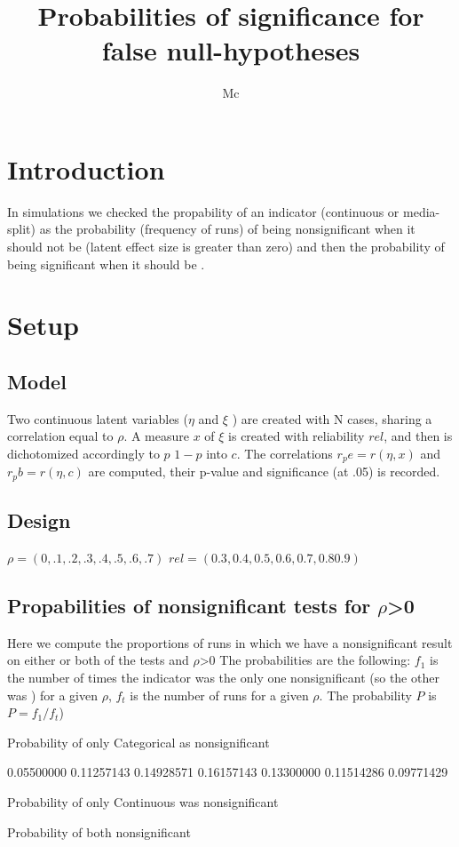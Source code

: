 \documentclass{article}
\begin{document}


\title{Probabilities of significance for false null-hypotheses}

\author{Mc}
\maketitle
\section*{Introduction}
In simulations we checked the propability of an indicator (continuous or media-split) as the probability (frequency of runs) of being nonsignificant when it should not be (latent effect size is greater than zero) and then the probability of being significant when it should be .
\section*{Setup}
\subsection*{Model}
Two continuous latent variables (\(\eta\) and \(\xi\) ) are created with N cases, sharing a correlation equal to \(\rho\). A measure \(x\) of \(\xi\) is created with reliability \(rel\), and then  is dichotomized accordingly to \(p\) \(1-p\) into \(c\). The correlations \( r_pe=r(\eta,x) \)  and \( r_pb=r(\eta,c) \) are computed, their p-value and significance (at .05) is recorded.
\subsection*{Design}
\(\rho=(0,.1,.2,.3,.4,.5,.6,.7) \)
\(rel=(0.3, 0.4 ,0.5, 0.6, 0.7 ,0.8 0.9) \) 


\subsection*{Propabilities of nonsignificant tests for  \(\rho\)>0}

Here we compute the proportions of runs in which we have a nonsignificant result on either or both of the tests and \(\rho\)>0
The probabilities are the following: \(f_1\) is the number of times the indicator was the only one nonsignificant (so the other was ) for a given \(\rho\), \(f_t\) is the number of runs for a given \(\rho\). The probability \(P\) is \(P=f_1 / f_t \))  


\begin{Schunk}
\begin{Soutput}
Probability of only Categorical as nonsignificant
\end{Soutput}
\begin{Soutput}
[1] 0.05500000 0.11257143 0.14928571 0.16157143 0.13300000 0.11514286 0.09771429
\end{Soutput}
\begin{Soutput}
Probability of  only Continuous was nonsignificant
\end{Soutput}
\begin{Soutput}
Probability of  both  nonsignificant
\end{Soutput}
\end{Schunk}
\end{document}
